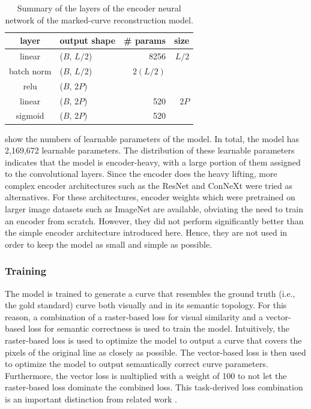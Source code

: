 \begin{table}[h]
    \centering
    \begin{tabular}{c|l|r|r}
         layer & output shape & \# params & size  \\
         \hline
         linear & ($B$, $L/2$) & 8256 & $L/2$  \\
         batch norm & ($B$, $L/2$) & $2(L/2)$ & \\
         \gls{relu} & ($B$, $2P$) &  &  \\
         linear & ($B$, $2P$) & 520 & $2P$  \\
         sigmoid & ($B$, $2P$) & 520 &  \\
    \end{tabular}
    \caption{Summary of the layers of the encoder neural network of the marked-curve reconstruction model.}
    \label{tab:decoder.summary}
\end{table}

 show the numbers of learnable parameters of the model. In total, the model has 2,169,672 learnable parameters. The distribution of these learnable parameters indicates that the model is encoder-heavy, with a large portion of them assigned to the convolutional layers. Since the encoder does the heavy lifting, more complex encoder architectures such as the ResNet \citep{DBLP:conf/cvpr/HeZRS16} and ConNeXt \citep{DBLP:conf/cvpr/0003MWFDX22} were tried as alternatives. For these architectures, encoder weights which were pretrained on larger image datasets such as ImageNet \citep{ILSVRC15} are available, obviating the need to train an encoder from scratch. However, they did not perform significantly better than the simple encoder architecture introduced here. Hence, they are not used in order to keep the model as small and simple as possible.


\subsubsection{Training}
\label{subsubsec:model.training}

The model is trained to generate a curve that resembles the ground truth (i.e., the gold standard) curve both visually and in its semantic topology. For this reason, a combination of a raster-based loss for visual similarity and a vector-based loss for semantic correctness is used to train the model. Intuitively, the raster-based loss is used to optimize the model to output a curve that covers the pixels of the original line as closely as possible. The vector-based loss is then used to optimize the model to output semantically correct curve parameters. Furthermore, the vector loss is multiplied with a weight of 100 to not let the raster-based loss dominate the combined loss. This task-derived loss combination is an important distinction from related work \citep{DBLP:conf/cvpr/Reddy21,mo2021virtualsketching,DBLP:conf/eccv/EgiazarianVAVST20}.

